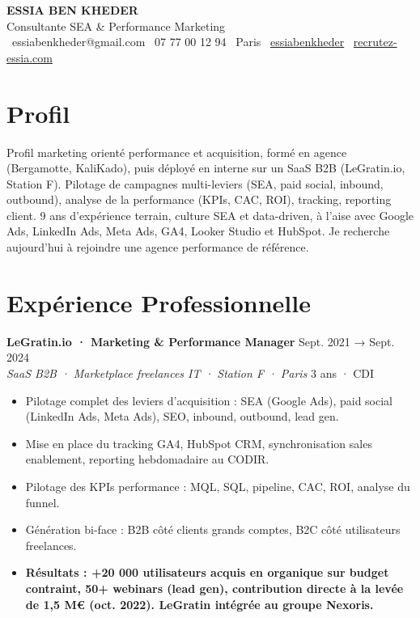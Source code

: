 \documentclass[a4paper,10pt]{article}
\newcommand{\expheader}[4]{%
  \textbf{\color{brown}#1} \hfill \color{greydark}\footnotesize #2 \\[-1pt]
  \textit{\color{greydark}\small #3} \hfill \color{greymid}\footnotesize #4 \\[2pt]
}
\begin{document}
\begin{center}
  {\LARGE\bfseries\color{brown} ESSIA BEN KHEDER}\\[4pt]
  {\color{olive}\normalsize Consultante SEA \& Performance Marketing}\\[6pt]
  {\footnotesize\color{greydark}
    \faEnvelope\ essiabenkheder@gmail.com \quad
    \faPhone\ 07 77 00 12 94 \quad
    \faMapMarker*\ Paris \quad
    \faLinkedin\ \href{https://linkedin.com/in/essiabenkheder}{essiabenkheder} \quad
    \faGlobe\ \href{https://recrutez-essia.com}{recrutez-essia.com}
  }
\end{center}

\vspace{-6pt}

\section{Profil}
Profil marketing orienté performance et acquisition, formé en agence (Bergamotte, KaliKado), puis déployé en interne sur un SaaS B2B (LeGratin.io, Station F). Pilotage de campagnes multi-leviers (SEA, paid social, inbound, outbound), analyse de la performance (KPIs, CAC, ROI), tracking, reporting client. 9 ans d'expérience terrain, culture SEA et data-driven, à l'aise avec Google Ads, LinkedIn Ads, Meta Ads, GA4, Looker Studio et HubSpot. Je recherche aujourd'hui à rejoindre une agence performance de référence.

\section{Expérience Professionnelle}

\expheader{LeGratin.io · Marketing \& Performance Manager}{Sept. 2021 → Sept. 2024}{SaaS B2B · Marketplace freelances IT · Station F · Paris}{3 ans · CDI}
\begin{itemize}[leftmargin=12pt,itemsep=1pt,topsep=2pt]
  \item Pilotage complet des leviers d'acquisition : SEA (Google Ads), paid social (LinkedIn Ads, Meta Ads), SEO, inbound, outbound, lead gen.
  \item Mise en place du tracking GA4, HubSpot CRM, synchronisation sales enablement, reporting hebdomadaire au CODIR.
  \item Pilotage des KPIs performance : MQL, SQL, pipeline, CAC, ROI, analyse du funnel.
  \item Génération bi-face : B2B côté clients grands comptes, B2C côté utilisateurs freelances.
  \item \textbf{Résultats : +20 000 utilisateurs acquis en organique sur budget contraint, 50+ webinars (lead gen), contribution directe à la levée de 1,5 M€ (oct. 2022). LeGratin intégrée au groupe Nexoris.}
\end{itemize}
\end{document}
